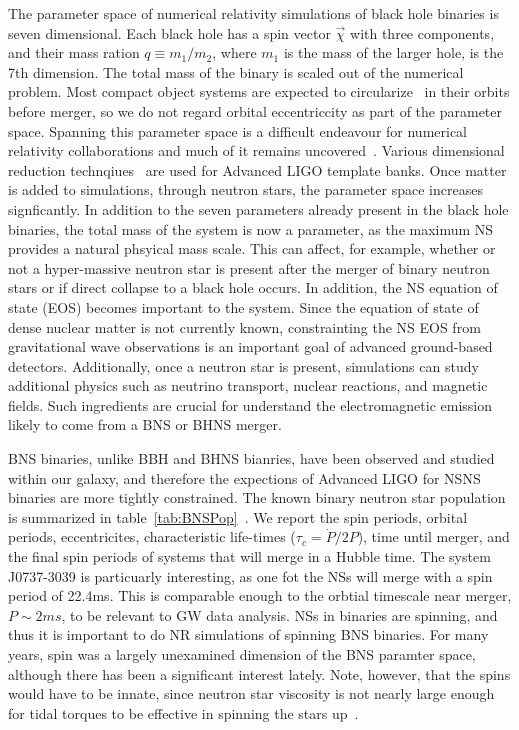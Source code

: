 The parameter space of numerical relativity simulations of black hole binaries is seven dimensional. Each black hole has a spin vector $\vec{\chi}$ with three components, and their mass ration $q\equiv m_1/m_2$, where $m_1$ is the mass of the larger hole, is the 7th dimension. The total mass of the binary is scaled out of the numerical problem. Most compact object systems are expected to circularize~\citep{PetersMathews1963,Peters1964} in their orbits before merger, so we do not regard orbital eccentriccity as part of the parameter space. Spanning this parameter space is a difficult endeavour for numerical relativity collaborations and much of it remains uncovered~\citep{Mroue:2013PRL,Chu:2015kft}. Various dimensional reduction technqiues~\citep{Canizares:2014fya} are used for Advanced LIGO template banks. Once matter is added to simulations, through neutron stars, the parameter space increases signficantly. In addition to the seven parameters already present in the black hole binaries, the total mass of the system is now a parameter, as the maximum NS provides a natural phsyical mass scale. This can affect, for example, whether or not a hyper-massive neutron star is present after the merger of binary neutron stars or if direct collapse to a black hole occurs. In addition, the NS equation of state (EOS) becomes important to the system. Since the equation of state of dense nuclear matter is not currently known, constrainting the NS EOS from gravitational wave observations is an important goal of advanced ground-based detectors. Additionally, once a neutron star is present, simulations can study additional physics such as neutrino transport, nuclear reactions, and magnetic fields. Such ingredients are crucial for understand the electromagnetic emission likely to come from a BNS or BHNS merger.

BNS binaries, unlike BBH and BHNS bianries, have been observed and studied within our galaxy, and therefore the expections of Advanced LIGO for NSNS binaries are more tightly constrained. The known binary neutron star population is summarized in table~\ref{tab:BNSPop}~\citep{Postnov:2014tza}. We report the spin periods, orbital periods, eccentricites, characteristic life-times ($\tau_{c}=\dot{P}/2P$), time until merger, and the final spin periods of systems that will merge in a Hubble time. The system J0737-3039 is particuarly interesting, as one fot the NSs will merge with a spin period of 22.4ms. This is comparable enough to the orbtial timescale near merger, $P\sim 2ms$, to be relevant to GW data analysis. NSs in binaries are spinning, and thus it is important to do NR simulations of spinning BNS binaries. For many years, spin was a largely unexamined dimension of the BNS paramter space, although there has been a significant interest lately. Note, however, that the spins would have to be innate, since neutron star viscosity is not nearly large enough for tidal torques to be effective in spinning the stars up~\citep{BildstenCutler1992}.

